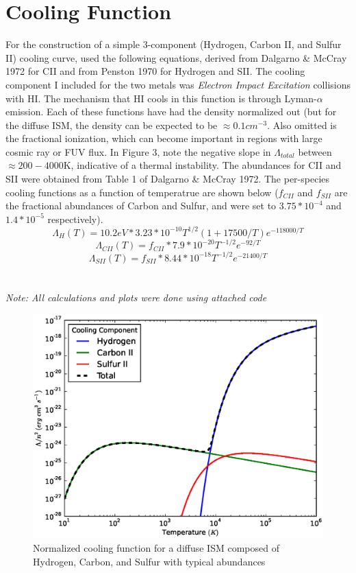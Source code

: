 \documentclass{article}
\begin{document}
\section{Cooling Function}
For the construction of a simple 3-component (Hydrogen, Carbon II, and Sulfur
II) cooling curve, used the following equations, derived from Dalgarno \& McCray
1972 for CII and from Penston 1970 for Hydrogen and SII.  The cooling component
I included for the two metals was \textit{Electron Impact Excitation} collisions
with HI.  The mechanism that HI cools in this function is through Lyman-$\alpha$
emission.  Each of these functions have had the density normalized out (but for
the diffuse ISM, the density can be expected to be $\approx 0.1 cm^{-3}$.  Also
omitted is the fractional ionization, which can become important in regions with
large cosmic ray or FUV flux.  In Figure 3, note the negative slope in
$\Lambda_{total}$ between  $\approx 200 - 4000 $K, indicative of a thermal
instability.  The abundances for CII and SII were obtained from Table 1 of 
Dalgarno \& McCray 1972.  The per-species cooling functions as a function of
temperatrue are shown below ($f_{CII}$ and $f_{SII}$ are the fractional
abundances of Carbon and Sulfur, and were set to $3.75*10^{-4}$ and
$1.4*10^{-5}$ respectively).
$$ \Lambda_{H} (T) = 10.2eV*3.23*10^{-10}T^{1/2}(1+17500/T)e^{-118000/T}$$
$$ \Lambda_{CII} (T) = f_{CII}*7.9*10^{-20}T^{-1/2}e^{-92/T}$$
$$ \Lambda_{SII} (T) = f_{SII}*8.44*10^{-18}T^{-1/2}e^{-21400/T}$$
\\
\\
\textit{Note: All calculations and plots were done using attached code}
\begin{figure}
	\includegraphics[scale=0.7]{cooling.eps}
\caption{Normalized cooling function for a diffuse ISM composed of Hydrogen,
Carbon, and Sulfur with typical abundances}
\end{figure}
\end{document}
